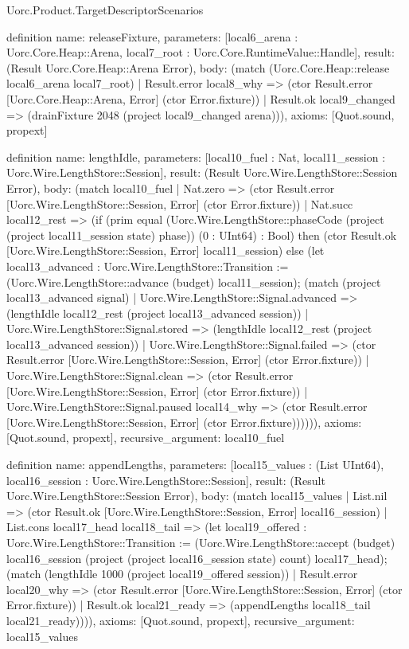 \begin{lexlean}{Uorc.Product.TargetDescriptorScenarios}
\begin{semanticmodule}
definition{
  name: releaseFixture,
  parameters: [local6_arena : Uorc.Core.Heap::Arena, local7_root : Uorc.Core.RuntimeValue::Handle],
  result: (Result Uorc.Core.Heap::Arena Error),
  body: (match (Uorc.Core.Heap::release local6_arena local7_root)
    | Result.error local8_why => (ctor Result.error [Uorc.Core.Heap::Arena, Error] (ctor Error.fixture))
    | Result.ok local9_changed => (drainFixture 2048 (project local9_changed arena))),
  axioms: [Quot.sound, propext]
}

definition{
  name: lengthIdle,
  parameters: [local10_fuel : Nat, local11_session : Uorc.Wire.LengthStore::Session],
  result: (Result Uorc.Wire.LengthStore::Session Error),
  body: (match local10_fuel
    | Nat.zero => (ctor Result.error [Uorc.Wire.LengthStore::Session, Error] (ctor Error.fixture))
    | Nat.succ local12_rest => (if (prim equal (Uorc.Wire.LengthStore::phaseCode (project (project local11_session state) phase)) (0 : UInt64) : Bool) then (ctor Result.ok [Uorc.Wire.LengthStore::Session, Error] local11_session) else (let local13_advanced : Uorc.Wire.LengthStore::Transition := (Uorc.Wire.LengthStore::advance (budget) local11_session); (match (project local13_advanced signal)
      | Uorc.Wire.LengthStore::Signal.advanced => (lengthIdle local12_rest (project local13_advanced session))
      | Uorc.Wire.LengthStore::Signal.stored => (lengthIdle local12_rest (project local13_advanced session))
      | Uorc.Wire.LengthStore::Signal.failed => (ctor Result.error [Uorc.Wire.LengthStore::Session, Error] (ctor Error.fixture))
      | Uorc.Wire.LengthStore::Signal.clean => (ctor Result.error [Uorc.Wire.LengthStore::Session, Error] (ctor Error.fixture))
      | Uorc.Wire.LengthStore::Signal.paused local14_why => (ctor Result.error [Uorc.Wire.LengthStore::Session, Error] (ctor Error.fixture)))))),
  axioms: [Quot.sound, propext],
  recursive_argument: local10_fuel
}

definition{
  name: appendLengths,
  parameters: [local15_values : (List UInt64), local16_session : Uorc.Wire.LengthStore::Session],
  result: (Result Uorc.Wire.LengthStore::Session Error),
  body: (match local15_values
    | List.nil => (ctor Result.ok [Uorc.Wire.LengthStore::Session, Error] local16_session)
    | List.cons local17_head local18_tail => (let local19_offered : Uorc.Wire.LengthStore::Transition := (Uorc.Wire.LengthStore::accept (budget) local16_session (project (project local16_session state) count) local17_head); (match (lengthIdle 1000 (project local19_offered session))
      | Result.error local20_why => (ctor Result.error [Uorc.Wire.LengthStore::Session, Error] (ctor Error.fixture))
      | Result.ok local21_ready => (appendLengths local18_tail local21_ready)))),
  axioms: [Quot.sound, propext],
  recursive_argument: local15_values
}


\end{semanticmodule}
\end{lexlean}
